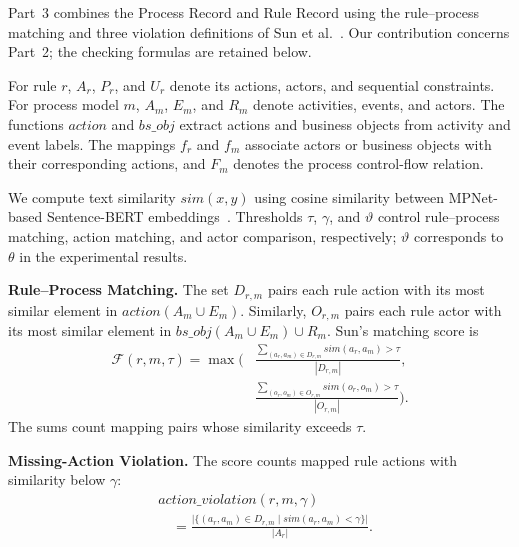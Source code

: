 \documentclass[conference]{IEEEtran}
\begin{document}
Part~3 combines the Process Record and Rule Record using the rule--process matching and three violation definitions of Sun et al.~\cite{sun2024design}. Our contribution concerns Part~2; the checking formulas are retained below.

For rule \(r\), \(A_r\), \(P_r\), and \(U_r\) denote its actions, actors, and sequential constraints. For process model \(m\), \(A_m\), \(E_m\), and \(R_m\) denote activities, events, and actors. The functions \(action\) and \(\mathit{bs\_obj}\) extract actions and business objects from activity and event labels. The mappings \(f_r\) and \(f_m\) associate actors or business objects with their corresponding actions, and \(F_m\) denotes the process control-flow relation.

We compute text similarity \(sim(x,y)\) using cosine similarity between MPNet-based Sentence-BERT embeddings~\cite{reimers2019sentence,song2020mpnet}. Thresholds \(\tau\), \(\gamma\), and \(\vartheta\) control rule--process matching, action matching, and actor comparison, respectively; \(\vartheta\) corresponds to \(\theta\) in the experimental results.

\textbf{Rule--Process Matching.}
The set \(D_{r,m}\) pairs each rule action with its most similar element in \(action(A_m\cup E_m)\). Similarly, \(O_{r,m}\) pairs each rule actor with its most similar element in \(\mathit{bs\_obj}(A_m\cup E_m)\cup R_m\). Sun's matching score is
\begin{equation}
\begin{aligned}
\mathcal{F}(r,m,\tau)
=\max\Biggl(
&\frac{\displaystyle\sum_{(a_r,a_m)\in D_{r,m}}
sim(a_r,a_m)>\tau}{|D_{r,m}|},\\[2pt]
&\frac{\displaystyle\sum_{(o_r,o_m)\in O_{r,m}}
sim(o_r,o_m)>\tau}{|O_{r,m}|}
\Biggr).
\end{aligned}
\label{eq:matching}
\end{equation}
The sums count mapping pairs whose similarity exceeds \(\tau\).

\textbf{Missing-Action Violation.}
The score counts mapped rule actions with similarity below \(\gamma\):
\begin{equation}
\begin{aligned}
&\mathit{action\_violation}(r,m,\gamma)\\
&\quad=
\frac{\bigl|\{(a_r,a_m)\in D_{r,m}
\mid sim(a_r,a_m)<\gamma\}\bigr|}{|A_r|}.
\end{aligned}
\label{eq:missing}
\end{equation}
\end{document}
